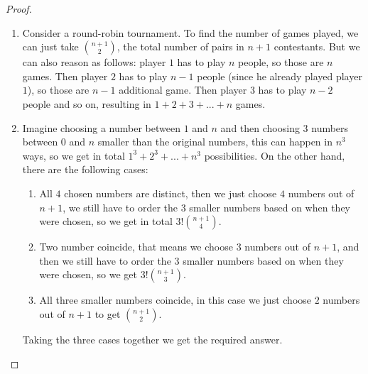 \begin{proof}
    \begin{enumerate}
        \item Consider a round-robin tournament. To find the number of games played, we can just take $\binom{n+1}{2}$, the total number of pairs in $n+1$ contestants. But we can also reason as follows: player $1$ has to play $n$ people, so those are $n$ games. Then player $2$ has to play $n-1$ people (since he already played player $1$), so those are $n-1$ additional game. Then player $3$ has to play $n-2$ people and so on, resulting in $1+2+3+...+n$ games.
        \item Imagine choosing a number between $1$ and $n$ and then choosing $3$ numbers between $0$ and $n$ smaller than the original numbers, this can happen in $n^3$ ways, so we get in total $1^3 + 2^3 + ... + n^3$ possibilities. On the other hand, there are the following cases:
        \begin{enumerate}
            \item All $4$ chosen numbers are distinct, then we just choose $4$ numbers out of $n+1$, we still have to order the $3$ smaller numbers based on when they were chosen, so we get in total $3!\binom{n+1}{4}$.
            \item Two number coincide, that means we choose $3$ numbers out of $n+1$, and then we still have to order the $3$ smaller numbers based on when they were chosen, so we get $3!\binom{n+1}{3}$.
            \item All three smaller numbers coincide, in this case we just choose $2$ numbers out of $n+1$ to get $\binom{n+1}{2}$.
        \end{enumerate}
        Taking the three cases together we get the required answer.
    \end{enumerate}
\end{proof}



